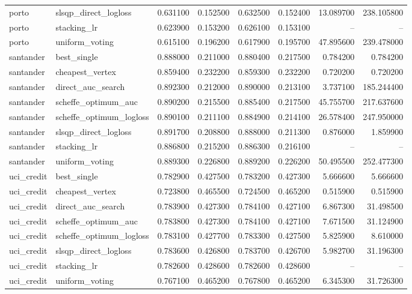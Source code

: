 \begin{longtable}{llrrrrrr}
porto & slsqp\_direct\_logloss & 0.631100 & 0.152500 & 0.632500 & 0.152400 & 13.089700 & 238.105800 \\
porto & stacking\_lr & 0.623900 & 0.153200 & 0.626100 & 0.153100 & -- & -- \\
porto & uniform\_voting & 0.615100 & 0.196200 & 0.617900 & 0.195700 & 47.895600 & 239.478000 \\
santander & best\_single & 0.888000 & 0.211000 & 0.880400 & 0.217500 & 0.784200 & 0.784200 \\
santander & cheapest\_vertex & 0.859400 & 0.232200 & 0.859300 & 0.232200 & 0.720200 & 0.720200 \\
santander & direct\_auc\_search & 0.892300 & 0.212000 & 0.890000 & 0.213100 & 3.737100 & 185.244400 \\
santander & scheffe\_optimum\_auc & 0.890200 & 0.215500 & 0.885400 & 0.217500 & 45.755700 & 217.637600 \\
santander & scheffe\_optimum\_logloss & 0.890100 & 0.211100 & 0.884900 & 0.214100 & 26.578400 & 247.950000 \\
santander & slsqp\_direct\_logloss & 0.891700 & 0.208800 & 0.888000 & 0.211300 & 0.876000 & 1.859900 \\
santander & stacking\_lr & 0.886800 & 0.215200 & 0.886300 & 0.216100 & -- & -- \\
santander & uniform\_voting & 0.889300 & 0.226800 & 0.889200 & 0.226200 & 50.495500 & 252.477300 \\
uci\_credit & best\_single & 0.782900 & 0.427500 & 0.783200 & 0.427300 & 5.666600 & 5.666600 \\
uci\_credit & cheapest\_vertex & 0.723800 & 0.465500 & 0.724500 & 0.465200 & 0.515900 & 0.515900 \\
uci\_credit & direct\_auc\_search & 0.783900 & 0.427300 & 0.784100 & 0.427100 & 6.867300 & 31.498500 \\
uci\_credit & scheffe\_optimum\_auc & 0.783800 & 0.427300 & 0.784100 & 0.427100 & 7.671500 & 31.124900 \\
uci\_credit & scheffe\_optimum\_logloss & 0.783100 & 0.427700 & 0.783300 & 0.427500 & 5.825900 & 8.610000 \\
uci\_credit & slsqp\_direct\_logloss & 0.783600 & 0.426800 & 0.783700 & 0.426700 & 5.982700 & 31.196300 \\
uci\_credit & stacking\_lr & 0.782600 & 0.428600 & 0.782600 & 0.428600 & -- & -- \\
uci\_credit & uniform\_voting & 0.767100 & 0.465200 & 0.767800 & 0.465200 & 6.345300 & 31.726300 \\
\end{longtable}\endgroup
